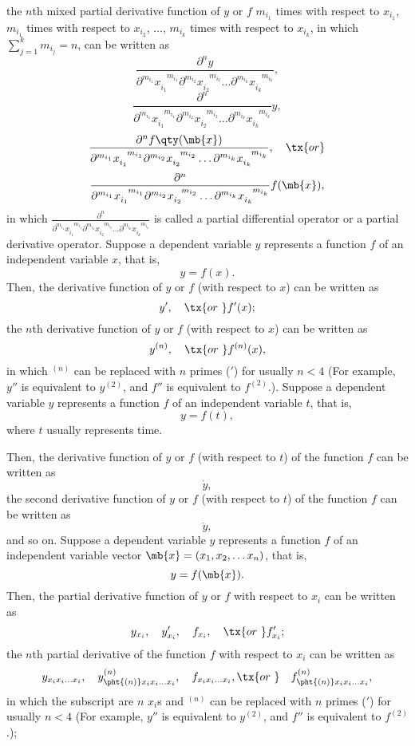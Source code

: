 \documentclass[a4paper,12pt]{report}
\begin{document}
\begin{itemize}
\begin{itemize}
the $n$th mixed partial derivative function of $y$ or $f$ $m_{i_1}$ times with respect to $x_{i_1}$, $m_{i_1}$ times with respect to $x_{i_2}$, $\dots $, $m_{i_k}$ times with respect to $x_{i_k}$, in which $\sum_{j=1}^km_{i_j}=n$, can be written as
\[\frac{\partial^ny}{\partial^{m_{i_1}}x_{i_1}^{\phantom{i_1}m_{i_1}}\partial^{m_{i_2}}x_{i_2}^{\phantom{i_2}m_{i_2}}\dots \partial^{m_{i_k}}x_{i_k}^{\phantom{i_k}m_{i_k}}},\]
\[\frac{\partial^n}{\partial^{m_{i_1}}x_{i_1}^{\phantom{i_1}m_{i_1}}\partial^{m_{i_2}}x_{i_2}^{\phantom{i_2}m_{i_2}}\dots \partial^{m_{i_k}}x_{i_k}^{\phantom{i_k}m_{i_k}}}y,\]
\[\frac{\partial^nf\qty(\mb{x})}{\partial^{m_{i_1}}x_{i_1}^{\phantom{i_1}m_{i_1}}\partial^{m_{i_2}}x_{i_2}^{\phantom{i_2}m_{i_2}}\dots \partial^{m_{i_k}}x_{i_k}^{\phantom{i_k}m_{i_k}}},\quad \tx{or}\]
\[\frac{\partial^n}{\partial^{m_{i_1}}x_{i_1}^{\phantom{i_1}m_{i_1}}\partial^{m_{i_2}}x_{i_2}^{\phantom{i_2}m_{i_2}}\dots \partial^{m_{i_k}}x_{i_k}^{\phantom{i_k}m_{i_k}}}f(\mb{x}),\]
in which $\frac{\partial^n}{\partial^{m_{i_1}}x_{i_1}^{\phantom{i_1}m_{i_1}}\partial^{m_{i_2}}x_{i_2}^{\phantom{i_2}m_{i_2}}\dots \partial^{m_{i_k}}x_{i_k}^{\phantom{i_k}m_{i_k}}}$ is called a partial differential operator or a partial derivative operator.
Suppose a dependent variable $y$ represents a function $f$ of an independent variable $x$, that is,
\[y=f(x).\]
Then, the derivative function of $y$ or $f$ (with respect to $x$) can be written as
\[y',\quad\tx{or\ }f'(x);\]
the $n$th derivative function of $y$ or $f$ (with respect to $x$) can be written as
\[y^{(n)},\quad\tx{or\ }f^{(n)}(x),\]
in which $^{(n)}$ can be replaced with $n$ primes ($'$) for usually $n<4$ (For example, $y''$ is equivalent to $y^{(2)}$, and $f''$ is equivalent to $f^{(2)}$.).
Suppose a dependent variable $y$ represents a function $f$ of an independent variable $t$, that is,
\[y=f(t),\]
where $t$ usually represents time.

Then, the derivative function of $y$ or $f$ (with respect to $t$) of the function $f$ can be written as
\[\dot{y},\]
the second derivative function of $y$ or $f$ (with respect to $t$) of the function $f$ can be written as
\[\ddot{y},\]
and so on.
Suppose a dependent variable $y$ represents a function $f$ of an independent variable vector $\mb{x}=(x_1,x_2,\dots x_n)$, that is,
\[y=f(\mb{x}).\]
Then, the partial derivative function of $y$ or $f$ with respect to $x_i$ can be written as
\[y_{x_i},\quad y'_{x_i},\quad f_{x_i},\quad \tx{or\ }f'_{x_i};\]
the $n$th partial derivative of the function $f$ with respect to $x_i$ can be written as
\[y_{x_ix_i\dots  x_i},\quad y^{(n)}_{\pht{(n)}x_ix_i\dots  x_i},\quad f_{x_ix_i\dots  x_i},\tx{or\ }\quad f^{(n)}_{\pht{(n)}x_ix_i\dots  x_i},\]
in which the subscript are $n$ $x_i$s and $^{(n)}$ can be replaced with $n$ primes ($'$) for usually $n<4$ (For example, $y''$ is equivalent to $y^{(2)}$, and $f''$ is equivalent to $f^{(2)}$.);


\end{itemize}
\end{itemize}
\end{document}
